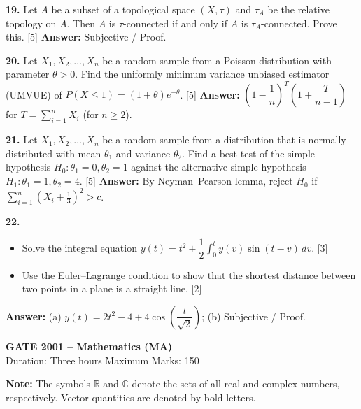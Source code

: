 \documentclass[11pt,a4paper]{article}
\newcommand{\ans}[1]{\textbf{Answer:} #1\par\medskip}
\begin{document}
\textbf{19.} Let $A$ be a subset of a topological space $(X, \tau)$ and $\tau_A$ be the relative topology on $A$. Then $A$ is $\tau$-connected if and only if $A$ is $\tau_A$-connected. Prove this. \hfill [5]
\ans{Subjective / Proof.}

\textbf{20.} Let $X_1, X_2, \dots, X_n$ be a random sample from a Poisson distribution with parameter $\theta > 0$. Find the uniformly minimum variance unbiased estimator (UMVUE) of $P(X \le 1) = (1 + \theta)e^{-\theta}$. \hfill [5]
\ans{$\left(1 - \dfrac{1}{n}\right)^{T}\!\left(1 + \dfrac{T}{n - 1}\right)$ for $T = \displaystyle\sum_{i=1}^n X_i$ (for $n \ge 2$).}

\textbf{21.} Let $X_1, X_2, \dots, X_n$ be a random sample from a distribution that is normally distributed with mean $\theta_1$ and variance $\theta_2$. Find a best test of the simple hypothesis $H_0 : \theta_1 = 0, \theta_2 = 1$ against the alternative simple hypothesis $H_1 : \theta_1 = 1, \theta_2 = 4$. \hfill [5]
\ans{By Neyman--Pearson lemma, reject $H_0$ if $\displaystyle\sum_{i=1}^n \left(X_i + \frac{1}{3}\right)^2 > c$.}

\textbf{22.}
\begin{itemize}
  \setlength{\itemsep}{3pt}\setlength{\parskip}{0pt}
  \item[(a)] Solve the integral equation $y(t) = t^2 + \dfrac{1}{2}\displaystyle\int_0^t y(v)\sin(t - v)\,dv$. \hfill [3]
  \item[(b)] Use the Euler--Lagrange condition to show that the shortest distance between two points in a plane is a straight line. \hfill [2]
\end{itemize}
\ans{(a) $y(t) = 2t^2 - 4 + 4\cos\!\left(\dfrac{t}{\sqrt{2}}\right)$; \quad (b) Subjective / Proof.}

\newpage


\begin{center}
  {\Large\bfseries GATE 2001 -- Mathematics (MA)}\\[4pt]
  {\small Duration: Three hours \quad\textbar\quad Maximum Marks: 150}
\end{center}

\medskip
\textbf{Note:} The symbols $\mathbb{R}$ and $\mathbb{C}$ denote the sets of all real and complex numbers, respectively. Vector quantities are denoted by bold letters.
\end{document}
